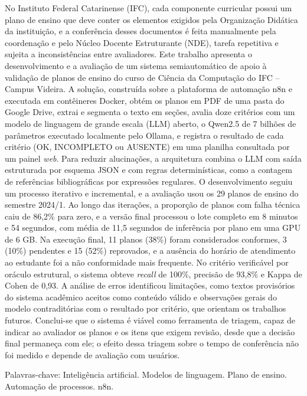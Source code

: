 \begin{resumo}
\noindent
No Instituto Federal Catarinense (IFC), cada componente curricular possui um plano de ensino que deve conter os elementos exigidos pela Organização Didática da instituição, e a conferência desses documentos é feita manualmente pela coordenação e pelo Núcleo Docente Estruturante (NDE), tarefa repetitiva e sujeita a inconsistências entre avaliadores. Este trabalho apresenta o desenvolvimento e a avaliação de um sistema semiautomático de apoio à validação de planos de ensino do curso de Ciência da Computação do IFC -- Campus Videira. A solução, construída sobre a plataforma de automação n8n e executada em contêineres Docker, obtém os planos em PDF de uma pasta do Google Drive, extrai e segmenta o texto em seções, avalia doze critérios com um modelo de linguagem de grande escala (LLM) aberto, o Qwen2.5 de 7 bilhões de parâmetros executado localmente pelo Ollama, e registra o resultado de cada critério (OK, INCOMPLETO ou AUSENTE) em uma planilha consultada por um painel \textit{web}. Para reduzir alucinações, a arquitetura combina o LLM com saída estruturada por esquema JSON e com regras determinísticas, como a contagem de referências bibliográficas por expressões regulares. O desenvolvimento seguiu um processo iterativo e incremental, e a avaliação usou os 29 planos de ensino do semestre 2024/1. Ao longo das iterações, a proporção de planos com falha técnica caiu de 86,2\% para zero, e a versão final processou o lote completo em 8 minutos e 54 segundos, com média de 11,5 segundos de inferência por plano em uma GPU de 6 GB. Na execução final, 11 planos (38\%) foram considerados conformes, 3 (10\%) pendentes e 15 (52\%) reprovados, e a ausência do horário de atendimento ao estudante foi a não conformidade mais frequente. No critério verificável por oráculo estrutural, o sistema obteve \textit{recall} de 100\%, precisão de 93,8\% e Kappa de Cohen de 0,93. A análise de erros identificou limitações, como textos provisórios do sistema acadêmico aceitos como conteúdo válido e observações gerais do modelo contraditórias com o resultado por critério, que orientam os trabalhos futuros. Conclui-se que o sistema é viável como ferramenta de triagem, capaz de indicar ao avaliador os planos e os itens que exigem revisão, desde que a decisão final permaneça com ele; o efeito dessa triagem sobre o tempo de conferência não foi medido e depende de avaliação com usuários.

 \vspace{0.2cm}
\noindent Palavras-chave: Inteligência artificial. Modelos de linguagem. Plano de ensino. Automação de processos. n8n.

\end{resumo}

